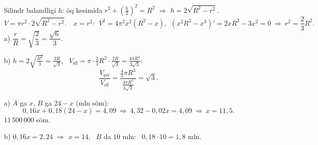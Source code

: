 \newpage
{}
Silindr balandligi $h$: öq kesimida $r^2+\left(\frac h2\right)^2=R^2$ $\Rightarrow$ $h=2\sqrt{R^2-r^2}$.
\[V=\pi r^2\cdot2\sqrt{R^2-r^2}.\quad x=r^2:\ \ V^2=4\pi^2x^2\left(R^2-x\right),\ \ \left(x^2R^2-x^3\right)'=2xR^2-3x^2=0\ \Rightarrow\ r^2=\frac23R^2.\]
a) $\dfrac rR=\sqrt{\dfrac23}=\dfrac{\sqrt6}3$.

b) $h=2\sqrt{\frac{R^2}3}=\frac{2R}{\sqrt3}$, \ $V_{\text{sil}}=\pi\cdot\frac23R^2\cdot\frac{2R}{\sqrt3}=\frac{4\pi R^3}{3\sqrt3}$:
\[\frac{V_{\text{şar}}}{V_{\text{sil}}}=\frac{\frac43\pi R^3}{\frac{4\pi R^3}{3\sqrt3}}=\sqrt3.\]

\newpage
{}
a) $A$ ga $x$, $B$ ga $24-x$ (mln söm):
\[0{,}16x+0{,}18(24-x)=4{,}09\ \Rightarrow\ 4{,}32-0{,}02x=4{,}09\ \Rightarrow\ x=11{,}5.\]
$11\,500\,000$ söm.

b) $0{,}16x=2{,}24$ $\Rightarrow$ $x=14$, \ $B$ da $10$ mln: \ $0{,}18\cdot10=1{,}8$ mln.

\ShowJavoblar

